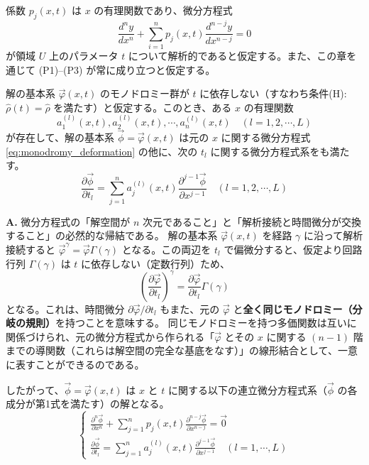 
係数 $p_{j}(x,t)$ は $x$ の有理関数であり、微分方程式 
\begin{equation}\label{eq:3.1_n-ODE}
\frac{d^{n}y}{dx^{n}}+\sum_{i=1}^{n}p_{j}(x,t)\frac{d^{n-j}y}{dx^{n-j}}=0
\end{equation}
が領域 $U$ 上のパラメータ $t$ について解析的であると仮定する。また、この章を通じて (P1)--(P3) が常に成り立つと仮定する。

\begin{proposition}\label{prop:3.1_time_evolution_equation}
解の基本系 $\vec{\varphi}(x,t)$ のモノドロミー群が $t$ に依存しない（すなわち条件(H): $\hat{\rho}(t) = \hat{\rho}$ を満たす）と仮定する。このとき、ある $x$ の有理関数
\[
a_{1}^{(l)}(x,t), a_{2}^{(l)}(x,t), \cdots, a_{n}^{(l)}(x,t) \quad (l=1,2,\cdots,L)
\]
が存在して、解の基本系 $\vec{\phi} = \vec{\varphi}(x,t)$ は元の $x$ に関する微分方程式 \eqref{eq:monodromy_deformation} の他に、次の $t_l$ に関する微分方程式系をも満たす。
\begin{equation}\label{eq:3.1_partial_t}
\frac{\partial \vec{\phi}}{\partial t_{l}} = \sum_{j=1}^{n}a_{j}^{(l)}(x,t)\frac{\partial^{j-1}\vec{\phi}}{\partial x^{j-1}} \quad (l=1,2,\cdots,L)
\end{equation}
\end{proposition}

\begin{Q}
\textbf{A.} 微分方程式の「解空間が $n$ 次元であること」と「解析接続と時間微分が交換すること」の必然的な帰結である。
解の基本系 $\vec{\varphi}(x,t)$ を経路 $\gamma$ に沿って解析接続すると $\vec{\varphi}^\gamma = \vec{\varphi} \Gamma(\gamma)$ となる。この両辺を $t_l$ で偏微分すると、仮定より回路行列 $\Gamma(\gamma)$ は $t$ に依存しない（定数行列）ため、
\[
\left(\frac{\partial \vec{\varphi}}{\partial t_l}\right)^\gamma = \frac{\partial \vec{\varphi}}{\partial t_l} \Gamma(\gamma)
\]
となる。これは、時間微分 $\partial \vec{\varphi} / \partial t_l$ もまた、元の $\vec{\varphi}$ と\textbf{全く同じモノドロミー（分岐の規則）}を持つことを意味する。
同じモノドロミーを持つ多価関数は互いに関係づけられ、元の微分方程式から作られる「$\vec{\varphi}$ とその $x$ に関する $(n-1)$ 階までの導関数（これらは解空間の完全な基底をなす）」の線形結合として、一意に表すことができるのである。
\end{Q}

したがって、$\vec{\phi}=\vec{\varphi}(x,t)$ は $x$ と $t$ に関する以下の連立微分方程式系（$\vec{\phi}$ の各成分が第1式を満たす）の解となる。
\begin{equation}\label{eq:3.1_deformation_system}
\begin{cases}
\displaystyle \frac{\partial^{n}\vec{\phi}}{\partial x^{n}} + \sum_{j=1}^{n} p_{j}(x,t)\frac{\partial^{n-j}\vec{\phi}}{\partial x^{n-j}} = \vec{0}  \\[1em]
\displaystyle \frac{\partial \vec{\phi}}{\partial t_{l}} = \sum_{j=1}^{n}a_{j}^{(l)}(x,t)\frac{\partial^{j-1}\vec{\phi}}{\partial x^{j-1}} \quad (l=1,\cdots,L)
\end{cases}
\end{equation}

